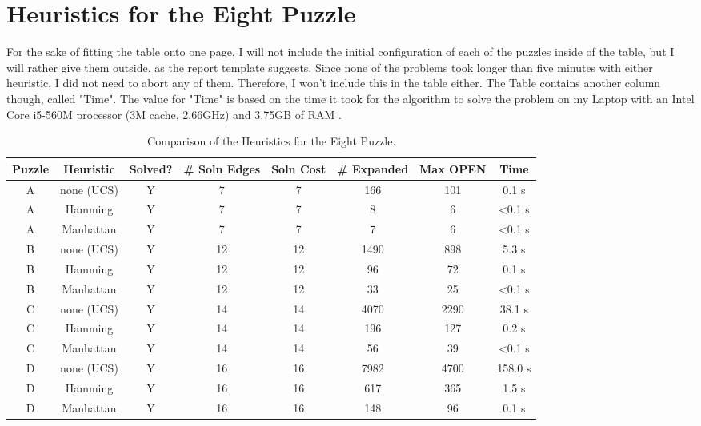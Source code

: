 \section{Heuristics for the Eight Puzzle} \label{sec:heuristics8}

For the sake of fitting the table onto one page, I will not include the initial configuration of each of the puzzles
inside of the table, but I will rather give them outside, as the report template suggests.
Since none of the problems took longer than five minutes with either heuristic, I did not need to abort any of them.
Therefore, I won't include this in the table either.
The Table contains another column though, called "Time".
The value for "Time" is based on the time it took for the algorithm to solve the problem on my Laptop with an Intel
Core i5-560M processor (3\;M cache, 2.66\;GHz) and 3.75\;GB of RAM .

\begin{table}[h]
    \centering
    \begin{tabular}{|c|c|c|c|c|c|c|c|}
        \hline
        Puzzle  & Heuristic   & Solved? & \# Soln Edges & Soln Cost & \# Expanded   & Max OPEN  & Time\\
        \hline
        A   & none (UCS) &   Y   &       7      &     7    &     166    &   101  &   0.1 s  \\
        A   & Hamming    &   Y   &       7      &     7    &       8    &     6  & \textless 0.1 s  \\
        A   & Manhattan  &   Y   &       7      &     7    &       7    &     6  & \textless 0.1 s  \\
        \hline
        B   & none (UCS) &   Y   &      12      &    12    &    1490    &   898  &   5.3 s  \\
        B   & Hamming    &   Y   &      12      &    12    &      96    &    72  &   0.1 s  \\
        B   & Manhattan  &   Y   &      12      &    12    &      33    &    25  & \textless 0.1 s  \\
        \hline
        C   & none (UCS) &   Y   &      14      &    14    &    4070    &  2290  &  38.1 s  \\
        C   & Hamming    &   Y   &      14      &    14    &     196    &   127  &   0.2 s  \\
        C   & Manhattan  &   Y   &      14      &    14    &      56    &    39  & \textless 0.1 s  \\
        \hline
        D   & none (UCS) &   Y   &      16      &    16    &    7982    &  4700  & 158.0 s  \\
        D   & Hamming    &   Y   &      16      &    16    &     617    &   365  &   1.5 s  \\
        D   & Manhattan  &   Y   &      16      &    16    &     148    &    96  &   0.1 s  \\
        \hline
    \end{tabular}
    \label{tab:heuristics8}
    \caption{Comparison of the Heuristics for the Eight Puzzle.}
\end{table}

